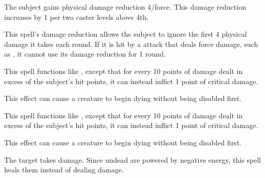 \spellrng{\rngclose}
\spelldur{\durshort}
\begin{spelleffect}
  The subject gains physical damage reduction 4/force. This damage reduction increases by 1 per two caster levels above 4th.
\end{spelleffect}
\begin{spellnotes}
  This spell's damage reduction allows the subject to ignore the first 4 physical damage it takes each round. If it is hit by a attack that deals force damage, such as , it cannot use its damage reduction for 1 round.
\end{spellnotes}

\begin{spelleffect}
  This spell functions like , except that for every 10 points of damage dealt in excess of the subject's hit points, it can instead inflict 1 point of critical damage.
\end{spelleffect}
\begin{spellnotes}
  This effect can cause a creature to begin dying without being disabled first.
\end{spellnotes}

\begin{spelleffect}
  This spell functions like , except that for every 10 points of damage dealt in excess of the subject's hit points, it can instead inflict 1 point of critical damage.
\end{spelleffect}
\begin{spellnotes}
  This effect can cause a creature to begin dying without being disabled first.
\end{spellnotes}

\spellrng{\rngclose}
\begin{spelleffect}
  The target takes damage. Since undead are powered by negative energy, this spell heals them instead of dealing damage.
\end{spelleffect}

